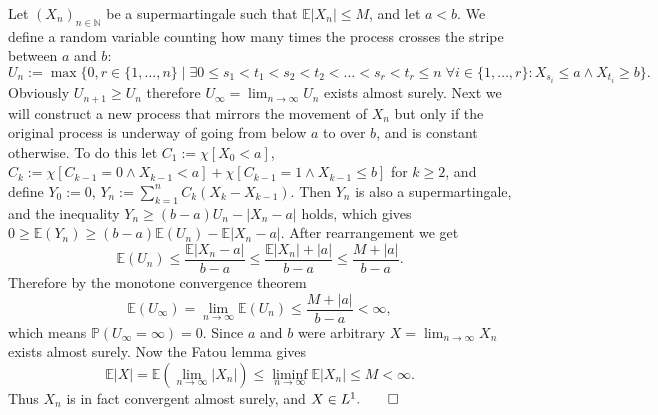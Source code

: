 \documentclass[12pt]{article}
\begin{document}
Let $(X_n)_{n\in\mathbb{N}}$ be a supermartingale such that $\mathbb{E}|X_n|\le M$, and let $a<b$. We define a random variable counting how many times the process crosses the stripe between $a$ and $b$:
\[U_n:=\max\{0,r\in\{1,\ldots,n\}\mid\exists 0\le s_1<t_1<s_2<t_2<\ldots<s_r<t_r\le n\;\forall i\in\{1,\ldots,r\}\colon X_{s_i}\le a\wedge X_{t_i}\ge b\}.\]
Obviously $U_{n+1}\ge U_n$ therefore $U_\infty=\lim_{n\to\infty}U_n$ exists almost surely. Next we will construct a new process that mirrors the movement of $X_n$ but only if the original process is underway of going from below $a$ to over $b$, and is constant otherwise. To do this let $C_1:=\chi[X_0<a]$, $C_k:=\chi[C_{k-1}=0\wedge X_{k-1}<a]+\chi[C_{k-1}=1\wedge X_{k-1}\le b]$ for $k\ge 2$, and define $Y_0:=0$, $Y_n:=\sum\limits_{k=1}^n C_k(X_k-X_{k-1})$. Then $Y_n$ is also a supermartingale, and the inequality $Y_n\ge(b-a)U_n-|X_n-a|$ holds, which gives $0\ge\mathbb{E}(Y_n)\ge(b-a)\mathbb{E}(U_n)-\mathbb{E}|X_n-a|$. After rearrangement we get
\[\mathbb{E}(U_n)\le\frac{\mathbb{E}|X_n-a|}{b-a}\le\frac{\mathbb{E}|X_n|+|a|}{b-a}\le\frac{M+|a|}{b-a}.\]
Therefore by the monotone convergence theorem
\[\mathbb{E}(U_\infty)=\lim_{n\to\infty}\mathbb{E}(U_n)\le\frac{M+|a|}{b-a}<\infty,\]
which means $\mathbb{P}(U_\infty=\infty)=0$. Since $a$ and $b$ were arbitrary $X=\lim_{n\to\infty}X_n$ exists almost surely. Now the Fatou lemma gives
\[\mathbb{E}|X|=\mathbb{E}(\lim_{n\to\infty}|X_n|)\le\liminf_{n\to\infty}\mathbb{E}|X_n|\le M<\infty.\]
Thus $X_n$ is in fact convergent almost surely, and $X\in L^1. \qed$
\end{document}

